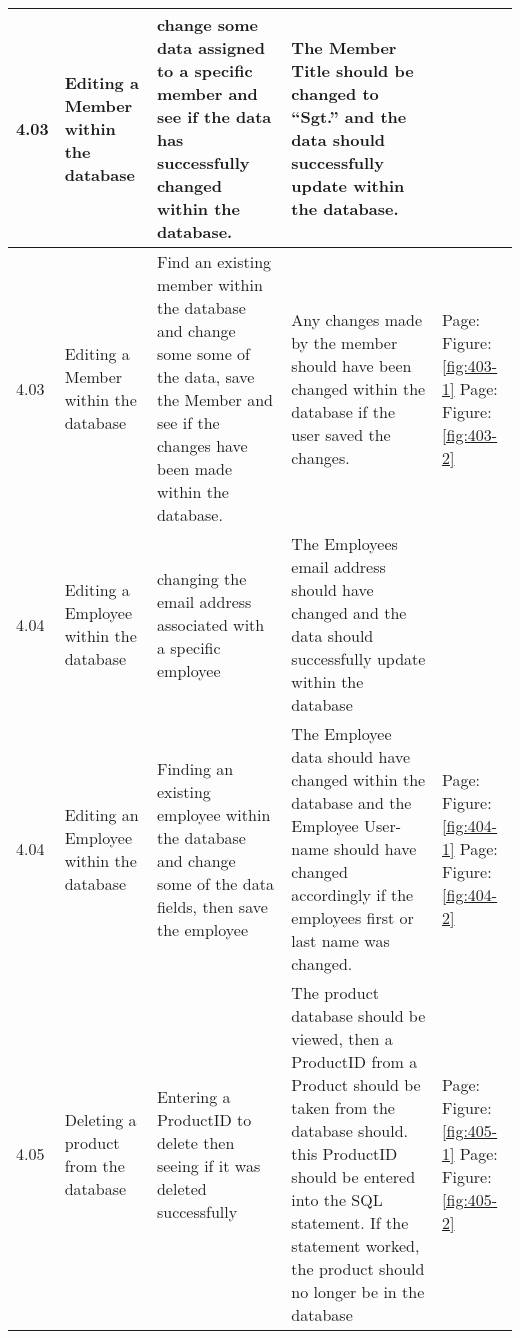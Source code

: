 \begin{flushleft}
\begin{longtable}{|p{1cm}|p{2.5cm}|p{2.5cm}|p{2cm}|p{2cm}|}
	\rowcolor{dark-grey}4.03 & Editing a Member within the database &  change some data assigned to a specific member and see if the data has successfully changed within the database. &  The Member Title should be changed to ``Sgt.'' and the data should successfully update within the database.  & \\ \hline
	\rowcolor{light-grey}4.03 & Editing a Member within the database & Find an existing member within the database and change some some of the data, save the Member and see if the changes have been made within the database. &  Any changes made by the member should have been changed within the database if the user saved the changes.& Page:\pageref{fig:403-1}  \newline Figure:\ref{fig:403-1} \newline \newline  Page:\pageref{fig:403-2}  \newline Figure:\ref{fig:403-2} \\ \hline
	\rowcolor{dark-grey}4.04 & Editing a Employee within the database &  changing the email address associated with a specific employee & The Employees email address should have changed and the data should successfully update within the database& \\ \hline
	\rowcolor{light-grey}4.04 & Editing an Employee within the database &  Finding an existing employee within the database and change some of the data fields, then save the employee & The Employee data should have changed within the database and the Employee User-name should have changed accordingly if the employees first or last name was changed.&  Page:\pageref{fig:404-1}  \newline Figure:\ref{fig:404-1} \newline \newline  Page:\pageref{fig:404-2}  \newline Figure:\ref{fig:404-2}\\ \hline
	4.05 & Deleting a product from the database &  Entering a ProductID to delete then seeing if it was deleted successfully & The product database should be viewed, then a ProductID from a Product should be taken from the database should. this ProductID should be entered into the SQL statement. If the statement worked, the product should no longer be in the database &  Page:\pageref{fig:405-1}  \newline Figure:\ref{fig:405-1} \newline \newline  Page:\pageref{fig:405-2}  \newline Figure:\ref{fig:405-2} \\ \hline

\end{longtable}
\end{flushleft}
